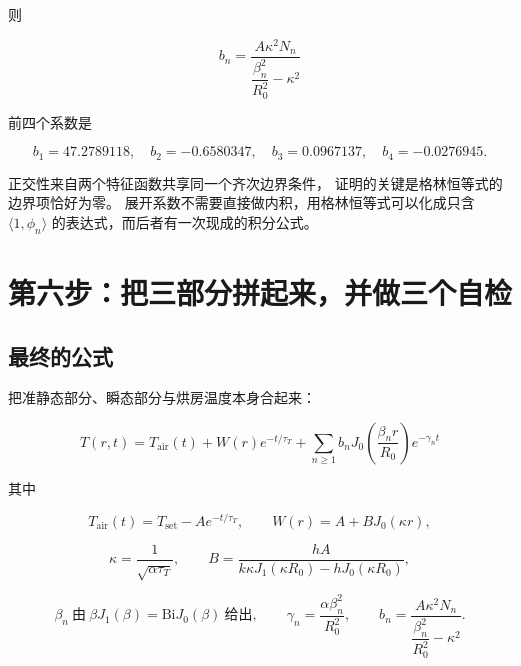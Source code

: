 则

\begin{equation}
\boxed{\ b_n=\frac{A\kappa^2N_n}{\dfrac{\beta_n^2}{R_0^2}-\kappa^2}\ }
\label{eq:p6-bn-final}
\end{equation}

前四个系数是

\begin{equation}
b_1=47.2789118,\quad b_2=-0.6580347,\quad
b_3=0.0967137,\quad b_4=-0.0276945 .
\label{eq:p6-bnnum}
\end{equation}

\begin{keypoint}
正交性来自两个特征函数共享同一个齐次边界条件，
证明的关键是格林恒等式的边界项恰好为零。
展开系数不需要直接做内积，用格林恒等式可以化成只含
$\langle1,\phi_n\rangle$ 的表达式，而后者有一次现成的积分公式。
\end{keypoint}

\section{第六步：把三部分拼起来，并做三个自检}

\subsection{最终的公式}

把准静态部分、瞬态部分与烘房温度本身合起来：

\begin{equation}
\boxed{\
T(r,t)=T_{\mathrm{air}}(t)+W(r)e^{-t/\tau_T}
+\sum_{n\ge1}b_n J_0\!\left(\frac{\beta_n r}{R_0}\right)e^{-\gamma_n t}
\ }
\label{eq:p6-final}
\end{equation}

其中

\begin{equation}
T_{\mathrm{air}}(t)=T_{\mathrm{set}}-Ae^{-t/\tau_T},
\qquad W(r)=A+BJ_0(\kappa r),
\end{equation}

\begin{equation}
\kappa=\frac{1}{\sqrt{\alpha\tau_T}},
\qquad
B=\frac{hA}{k\kappa J_1(\kappa R_0)-hJ_0(\kappa R_0)},
\end{equation}

\begin{equation}
\beta_n\ \text{由}\ \beta J_1(\beta)=\mathrm{Bi}J_0(\beta)\ \text{给出},
\qquad
\gamma_n=\frac{\alpha\beta_n^2}{R_0^2},
\qquad
b_n=\frac{A\kappa^2N_n}{\dfrac{\beta_n^2}{R_0^2}-\kappa^2}.
\end{equation}

